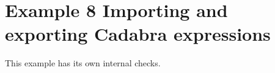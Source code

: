 \documentclass[12pt]{cdblatex}
\begin{document}
\section*{Example 8 Importing and exporting Cadabra expressions}

This example has its own internal checks.
\end{document}
